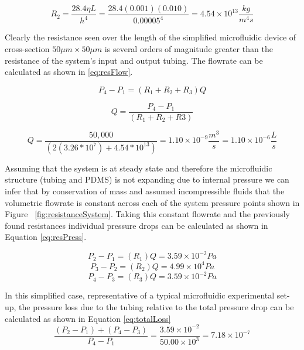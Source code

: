 \begin{equation}
R_2 = \frac{28.4 \eta L}{ h^4}= \frac{28.4 (0.001) (0.010)}{ 0.00005^4} = 4.54 \times 10^{13}\frac{kg}{m^4s}
\label{eq:resSquare}
\end{equation}


Clearly the resistance seen over the length of the simplified microfluidic device of cross-section $50 \mu m \times 50 \mu m$ is several orders of magnitude greater than the resistance of the system's input and output tubing. The flowrate can be calculated as shown in \vref{eq:resFlow}.

\begin{equation*}
P_4 - P_1 = (R_1 + R_2 + R_3) Q
\end{equation*}

\begin{equation*}
Q = \frac{P_4 - P_1 }{(R_1 + R_2 + R3)}
\end{equation*}

\begin{equation}
Q = \frac{50,000}{(2 (3.26*10^7) + 4.54*10^{13})} = 1.10  \times 10^{-9} \frac{m^3}{s} = 1.10  \times 10^{-6} \frac{L}{s}
\label{eq:resFlow}
\end{equation}

Assuming that the system is at steady state and therefore the microfluidic structure (tubing and PDMS) is not expanding due to internal pressure we can infer that by conservation of mass and assumed incompressible fluids that the volumetric flowrate is constant across each of the system pressure points shown in Figure ~\vref{fig:resistanceSystem}. Taking this constant flowrate and the previously found resistances individual pressure drops can be calculated as shown in Equation \vref{eq:resPress}.

\begin{equation*}
P_2 - P_1 = (R_1) Q = 3.59 \times 10^{-2} Pa
\end{equation*}
\begin{equation*}
P_3- P_2 = (R_2)Q = 4.99 \times 10^{4 }Pa
\end{equation*}
\begin{equation}
P_4 - P_3 = (R_3) Q = 3.59 \times 10^{-2} Pa
\label{eq:resPress}
\end{equation}

In this simplified case, representative of a typical microfluidic experimental set-up, the pressure loss due to the tubing relative to the total pressure drop can be calculated as shown in Equation \vref{eq:totalLoss}
\begin{equation}
\frac{(P_2-P_1)+(P_4-P_3)}{P_4-P_1} = \frac{3.59 \times 10^{-2}}{50.00 \times 10^{3}} = 7.18 \times 10^{-7}
\label{eq:totalLoss}
\end{equation}

